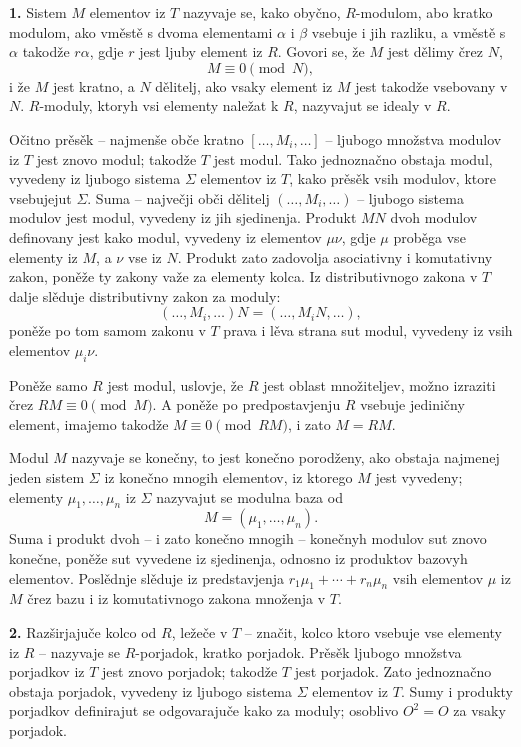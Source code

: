 \documentclass[11pt]{article}
\begin{document}
\textbf{1.} Sistem $M$ elementov iz $T$ nazyvaje se, kako obyčno, $R$-modulom, abo kratko modulom, ako vměstě s dvoma elementami $\alpha$ i $\beta$ vsebuje i jih razliku, a vměstě s $\alpha$ takodže $r\alpha$, gdje $r$ jest ljuby element iz $R$. Govori se, že $M$ jest dělimy črez $N$,
\[
        M\equiv 0 \pmod N,
\]
i že $M$ jest kratno, a $N$ dělitelj, ako vsaky element iz $M$ jest takodže vsebovany v $N$. $R$-moduly, ktoryh vsi elementy naležat k $R$, nazyvajut se idealy v $R$.

Očitno prěsěk -- najmenše obče kratno $[\ldots,M_i,\ldots]$ -- ljubogo množstva modulov iz $T$ jest znovo modul; takodže $T$ jest modul. Tako jednoznačno obstaja modul, vyvedeny iz ljubogo sistema $\Sigma$ elementov iz $T$, kako prěsěk vsih modulov, ktore vsebujejut $\Sigma$. Suma -- največji obči dělitelj $(\ldots,M_i,\ldots)$ -- ljubogo sistema modulov jest modul, vyvedeny iz jih sjedinenja. Produkt $MN$ dvoh modulov definovany jest kako modul, vyvedeny iz elementov $\mu\nu$, gdje $\mu$ proběga vse elementy iz $M$, a $\nu$ vse iz $N$. Produkt zato zadovolja asociativny i komutativny zakon, poněže ty zakony važe za elementy kolca. Iz distributivnogo zakona v $T$ dalje slěduje distributivny zakon za moduly:
\[
        (\ldots,M_i,\ldots)N=(\ldots,M_iN,\ldots),
\]
poněže po tom samom zakonu v $T$ prava i lěva strana sut modul, vyvedeny iz vsih elementov $\mu_i\nu$.

Poněže samo $R$ jest modul, uslovje, že $R$ jest oblast množiteljev, možno izraziti črez $RM\equiv0\pmod M$. A poněže po predpostavjenju $R$ vsebuje jediničny element, imajemo takodže $M\equiv0\pmod{RM}$, i zato $M=RM$.

Modul $M$ nazyvaje se konečny, to jest konečno porodženy, ako obstaja najmenej jeden sistem $\Sigma$ iz konečno mnogih elementov, iz ktorego $M$ jest vyvedeny; elementy $\mu_1,\ldots,\mu_n$ iz $\Sigma$ nazyvajut se modulna baza od
\[
        M=(\mu_1,\ldots,\mu_n).
\]
Suma i produkt dvoh -- i zato konečno mnogih -- konečnyh modulov sut znovo konečne, poněže sut vyvedene iz sjedinenja, odnosno iz produktov bazovyh elementov. Poslědnje slěduje iz predstavjenja $r_1\mu_1+\cdots+r_n\mu_n$ vsih elementov $\mu$ iz $M$ črez bazu i iz komutativnogo zakona množenja v $T$.

\textbf{2.} Razširjajuče kolco od $R$, ležeče v $T$ -- značit, kolco ktoro vsebuje vse elementy iz $R$ -- nazyvaje se $R$-porjadok, kratko porjadok. Prěsěk ljubogo množstva porjadkov iz $T$ jest znovo porjadok; takodže $T$ jest porjadok. Zato jednoznačno obstaja porjadok, vyvedeny iz ljubogo sistema $\Sigma$ elementov iz $T$. Sumy i produkty porjadkov definirajut se odgovarajuče kako za moduly; osoblivo $O^2=O$ za vsaky porjadok.
\end{document}
